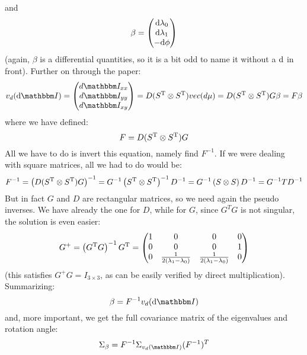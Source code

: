 \documentclass[a4paper,11pt]{article}
\newcommand{\itm}{\mathbbm I}
\newcommand{\itc}[1]{\itm_{#1}}
\newcommand{\diff}{{\rm d}}
\begin{document}
and
\begin{equation}
  \beta =
  \begin{pmatrix}
    \diff\lambda_0\\
    \diff\lambda_1\\
    -\diff\phi
  \end{pmatrix}
\end{equation}
(again, $\beta$ is a differential quantities, so it is a bit odd to name
it without a $\diff$ in front). Further on through the paper:
\begin{equation}
  v_d(\diff\itm) =
  \begin{pmatrix}
    d\itc{xx}\\
    d\itc{yy}\\
    d\itc{xy}
  \end{pmatrix} =
  D (S^{\rm T} \otimes S^{\rm T}) vec(d\mu) =
  D (S^{\rm T} \otimes S^{\rm T}) G\beta = F\beta
\end{equation}
where we have defined:
\begin{equation}
  F = D (S^{\rm T} \otimes S^{\rm T}) G
\end{equation}
All we have to do is invert this equation, namely find $F^{-1}$. If we were
dealing with square matrices, all we had to do would be:
$$
F^{-1} = \left( D (S^{\rm T} \otimes S^{\rm T}) G \right)^{-1} =
G^{-1} \left( S^{\rm T} \otimes S^{\rm T} \right)^{-1} D^{-1} = 
G^{-1} \left( S \otimes S \right) D^{-1} = G^{-1} T D^{-1}
$$
But in fact $G$ and $D$ are rectangular matrices, so we need again the pseudo
inverses. We have already the one for $D$, while for $G$, since
$G^TG$ is not singular, the solution is even easier:
\begin{equation}
  G^+ = \left( G^{\rm T}G \right)^{-1} G^{\rm T} =
  \begin{pmatrix}
    1 & 0 & 0 & 0\\
    0 & 0 & 0 & 1\\
    0 & \frac{1}{2(\lambda_1-\lambda_0)} & \frac{1}{2(\lambda_1-\lambda_0)} & 0
  \end{pmatrix}
\end{equation}
(this satisfies $G^+G = I_{3\times3}$, as can be easily verified by direct
multiplication). Summarizing:
\begin{equation}
  \beta = F^{-1}v_d(\diff\itm)
\end{equation}
and, more important, we get the full covariance matrix of the eigenvalues
and rotation angle:
\begin{equation}
  \Sigma_\beta = F^{-1} \Sigma_{v_d(\itm)} (F^{-1})^T
\end{equation}
\end{document}
